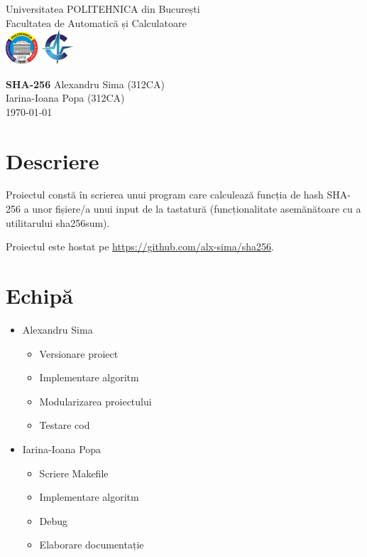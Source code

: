 \documentclass{article}
\begin{document}
\pagestyle{fancy}
\begin{titlepage}
      \begin{center}
            Universitatea POLITEHNICA din București \\
            Facultatea de Automatică și Calculatoare \\[5px]
            \includegraphics[width=1.2cm]{upb.jpg}
            \includegraphics[width=1.2cm]{acs.jpg}

            \vfill
            {\huge\bf SHA-256}
            \vfill
            Alexandru Sima (312CA) \\
            Iarina-Ioana Popa (312CA) \\
            \small\today
      \end{center}
\end{titlepage}

\tableofcontents
\newpage

\section{Descriere}
Proiectul constă în scrierea unui program care calculează funcția de hash
SHA-256 a unor fișiere/a unui input de la tastatură (funcționalitate
asemănătoare cu a utilitarului sha256sum).

Proiectul este hostat pe 
\url{https://github.com/alx-sima/sha256}.

\section{Echipă}
\begin{itemize}
      \item Alexandru Sima
            \begin{itemize}
                  \item Versionare proiect
                  \item Implementare algoritm
                  \item Modularizarea proiectului
                  \item Testare cod
            \end{itemize}
      \item Iarina-Ioana Popa
            \begin{itemize}
                  \item Scriere Makefile
                  \item Implementare algoritm
                  \item Debug
                  \item Elaborare documentație
            \end{itemize}
\end{itemize}
\end{document}
